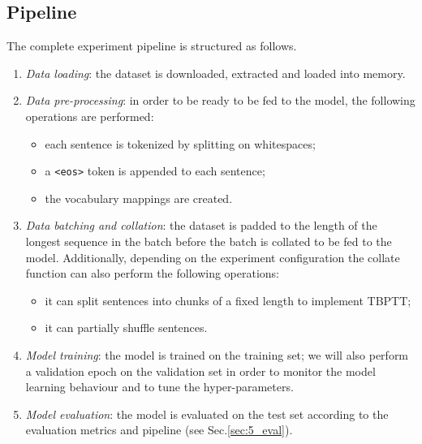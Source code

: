 \subsection{Pipeline}
The complete experiment pipeline is structured as follows.
\begin{enumerate}
    \item \emph{Data loading}: the dataset is downloaded, extracted and loaded into memory.
    \item \emph{Data pre-processing}: in order to be ready to be fed to the model, the following operations are performed:
    \begin{itemize} 
        \item each sentence is tokenized by splitting on whitespaces;
        \item a \texttt{<eos>} token is appended to each sentence;
        \item the vocabulary mappings are created.
    \end{itemize}
    \item \emph{Data batching and  collation}: the dataset is padded to the length of the longest sequence in the batch before the batch is collated to be fed to the model. Additionally, depending on the experiment configuration the collate function can also perform the following operations:
    \begin{itemize}
        \item it can split sentences into chunks of a fixed length to implement TBPTT;
        \item it can partially shuffle sentences.
    \end{itemize}
    \item \emph{Model training}: the model is trained on the training set; we will also perform a validation epoch on the validation set in order to monitor the model learning behaviour and to tune the hyper-parameters.
    \item \emph{Model evaluation}: the model is evaluated on the test set according to the evaluation metrics and pipeline (see Sec.\ref{sec:5_eval}).
\end{enumerate}


